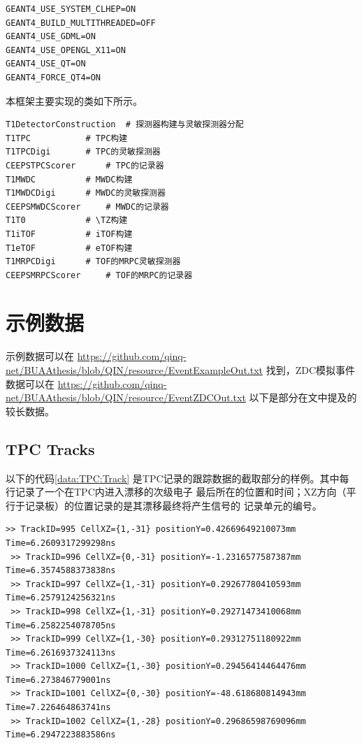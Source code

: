 \documentclass[bachelor,openany,oneside,color]{buaathesis}
\def\TZ{T\textsubscript{0}}
\begin{document}
\begin{lstlisting}[caption={Geant4 编译选项}]
GEANT4_USE_SYSTEM_CLHEP=ON
GEANT4_BUILD_MULTITHREADED=OFF
GEANT4_USE_GDML=ON
GEANT4_USE_OPENGL_X11=ON
GEANT4_USE_QT=ON
GEANT4_FORCE_QT4=ON
\end{lstlisting}

本框架主要实现的类如下所示。

\begin{lstlisting}[caption={主要实现的类}]
T1DetectorConstruction	# 探测器构建与灵敏探测器分配
T1TPC			# TPC构建
T1TPCDigi		# TPC的灵敏探测器
CEEPSTPCScorer		# TPC的记录器
T1MWDC 			# MWDC构建
T1MWDCDigi		# MWDC的灵敏探测器
CEEPSMWDCScorer		# MWDC的记录器
T1T0			# \TZ构建
T1iTOF 			# iTOF构建
T1eTOF 			# eTOF构建
T1MRPCDigi 		# TOF的MRPC灵敏探测器
CEEPSMRPCScorer		# TOF的MRPC的记录器
\end{lstlisting}

\chapter{示例数据}\label{chap:data}

示例数据可以在
{\do{\/}\do{-}
\url{https://github.com/qinq-net/BUAAthesis/blob/QIN/resource/EventExampleOut.txt}
}
找到，ZDC模拟事件数据可以在
{\do{\/}\do{-}
\url{https://github.com/qinq-net/BUAAthesis/blob/QIN/resource/EventZDCOut.txt}
}
以下是部分在文中提及的较长数据。

\section{TPC Tracks}\label{sec:data:TPC:Track}

以下的代码\ref{data:TPC:Track}
是TPC记录的跟踪数据的截取部分的样例。其中每行记录了一个在TPC内进入漂移的次级电子
最后所在的位置和时间；XZ方向（平行于记录板）的位置记录的是其漂移最终将产生信号的
记录单元的编号。
\begin{lstlisting}[caption={TPC Tracks},label={data:TPC:Track},firstnumber=2650,lastline=2657]
 >> TrackID=995 CellXZ={1,-31} positionY=0.42669649210073mm Time=6.2609317299298ns
 >> TrackID=996 CellXZ={0,-31} positionY=-1.2316577587387mm Time=6.3574588373838ns
 >> TrackID=997 CellXZ={1,-31} positionY=0.29267780410593mm Time=6.2579124256321ns
 >> TrackID=998 CellXZ={1,-31} positionY=0.29271473410068mm Time=6.2582254078705ns
 >> TrackID=999 CellXZ={1,-30} positionY=0.29312751180922mm Time=6.2616937324113ns
 >> TrackID=1000 CellXZ={1,-30} positionY=0.29456414464476mm Time=6.273846779001ns
 >> TrackID=1001 CellXZ={0,-30} positionY=-48.618680814943mm Time=7.226464863741ns
 >> TrackID=1002 CellXZ={1,-28} positionY=0.29686598769096mm Time=6.2947223883586ns
\end{lstlisting}
\end{document}
